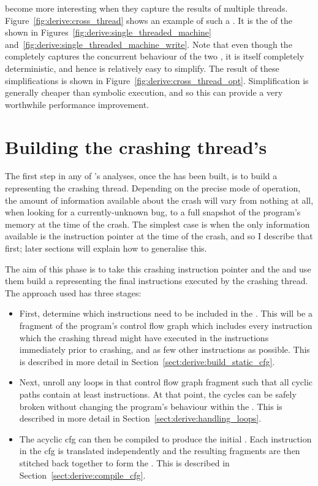 {\STateMachines} become more interesting when they capture the results
of multiple threads.  Figure~\ref{fig:derive:cross_thread} shows an
example of such a {\StateMachine}.  It is the
 of the {\StateMachines} shown in
Figures~\ref{fig:derive:single_threaded_machine}
and~\ref{fig:derive:single_threaded_machine_write}.  Note that even
though the {\StateMachine} completely captures the concurrent
behaviour of the two {\StateMachines}, it is itself completely
deterministic, and hence is relatively easy to simplify.  The result
of these simplifications is shown in
Figure~\ref{fig:derive:cross_thread_opt}.  Simplification is generally
cheaper than symbolic execution, and so this can provide a very
worthwhile performance improvement.

\section{Building the crashing thread's \StateMachine}

The first step in any of {\technique}'s analyses, once the
 has been built, is to build a {\StateMachine}
representing the crashing thread.  Depending on the precise mode of
operation, the amount of information available about the crash will
vary from nothing at all, when looking for a currently-unknown bug, to
a full snapshot of the program's memory at the time of the crash.  The
simplest case is when the only information available is the
instruction pointer at the time of the crash, and so I describe that
first; later sections will explain how to generalise this.

The aim of this phase is to take this crashing instruction pointer and
the  and use them build a {\StateMachine}
representing the final \backref{$\alpha$} instructions executed by the
crashing thread.  The approach used has three stages:

\begin{itemize}
\item First, determine which instructions need to be included in the
  {\StateMachine}.  This will be a fragment of the program's control
  flow graph which includes every instruction which the crashing
  thread might have executed in the \backref{$\alpha$} instructions
  immediately prior to crashing, and as few other instructions as
  possible.  This is described in more detail in
  Section~\ref{sect:derive:build_static_cfg}.
\item Next, unroll any loops in that control flow graph fragment such
  that all cyclic paths contain at least \backref{$\alpha$}
  instructions.  At that point, the cycles can be safely broken
  without changing the program's behaviour within the
  .  This is described in more detail in
  Section~\ref{sect:derive:handling_loops}.
\item The acyclic \gls{cfg} can then be compiled to produce the
  initial {\StateMachine}.  Each instruction in the \gls{cfg} is
  translated independently and the resulting fragments are then
  stitched back together to form the {\StateMachine}.  This is
  described in Section~\ref{sect:derive:compile_cfg}.
\end{itemize}


